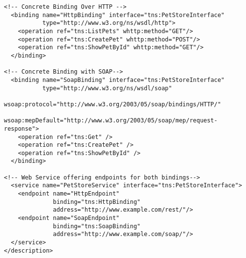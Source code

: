 \begin{verbatim}
<!-- Concrete Binding Over HTTP -->
  <binding name="HttpBinding" interface="tns:PetStoreInterface"
           type="http://www.w3.org/ns/wsdl/http">
    <operation ref="tns:ListPets" whttp:method="GET"/>
    <operation ref="tns:CreatePet" whttp:method="POST"/>
    <operation ref="tns:ShowPetById" whttp:method="GET"/>
  </binding>

<!-- Concrete Binding with SOAP-->
  <binding name="SoapBinding" interface="tns:PetStoreInterface"
           type="http://www.w3.org/ns/wsdl/soap"
           wsoap:protocol="http://www.w3.org/2003/05/soap/bindings/HTTP/"
           wsoap:mepDefault="http://www.w3.org/2003/05/soap/mep/request-response">
    <operation ref="tns:Get" />
    <operation ref="tns:CreatePet" />
    <operation ref="tns:ShowPetById" />
  </binding>

<!-- Web Service offering endpoints for both bindings-->
  <service name="PetStoreService" interface="tns:PetStoreInterface">
    <endpoint name="HttpEndpoint"
              binding="tns:HttpBinding"
              address="http://www.example.com/rest/"/>
    <endpoint name="SoapEndpoint"
              binding="tns:SoapBinding"
              address="http://www.example.com/soap/"/>
  </service>
</description>
\end{verbatim}
